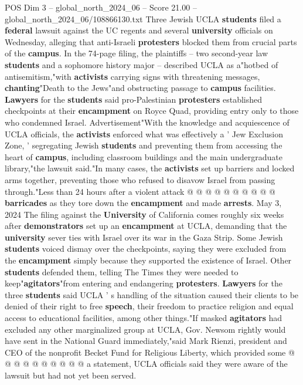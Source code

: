 \begin{textsample}{POS Dim 3 – global\_north\_2024\_06 – Score 21.00 – global\_north\_2024\_06/108866130.txt}  \label{ex:f3_pos_073}
Three Jewish UCLA \textbf{students} filed a \textbf{federal} lawsuit against the UC regents and several \textbf{university} officials on Wednesday, alleging that anti-Israeli \textbf{protesters} blocked them from crucial parts of the \textbf{campus}.
In the 74-page filing, the plaintiffs -- two second-year law \textbf{students} and a sophomore history major -- described UCLA as a"hotbed of antisemitism,"with \textbf{activists} carrying signs with threatening messages, \textbf{chanting}"Death to the Jews"and obstructing passage to \textbf{campus} facilities. \textbf{Lawyers} for the \textbf{students} said pro-Palestinian \textbf{protesters} established checkpoints at their \textbf{encampment} on Royce Quad, providing entry only to those who condemned Israel.
Advertisement"With the knowledge and acquiescence of UCLA officials, the \textbf{activists} enforced what was effectively a ' Jew Exclusion Zone, ' segregating Jewish \textbf{students} and preventing them from accessing the heart of \textbf{campus}, including classroom buildings and the main undergraduate library,"the lawsuit said."In many cases, the \textbf{activists} set up barriers and locked arms together, preventing those who refused to disavow Israel from passing through."Less than 24 hours after a violent attack @ @ @ @ @ @ @ @ @ @ \textbf{barricades} as they tore down the \textbf{encampment} and made \textbf{arrests}.
May 3, 2024 The filing against the \textbf{University} of California comes roughly six weeks after \textbf{demonstrators} set up an \textbf{encampment} at UCLA, demanding that the \textbf{university} sever ties with Israel over its war in the Gaza Strip.
Some Jewish \textbf{students} voiced dismay over the checkpoints, saying they were excluded from the \textbf{encampment} simply because they supported the existence of Israel.
Other \textbf{students} defended them, telling The Times they were needed to keep"\textbf{agitators}"from entering and endangering \textbf{protesters}. \textbf{Lawyers} for the three \textbf{students} said UCLA ' s handling of the situation caused their clients to be denied of their right to free \textbf{speech}, their freedom to practice religion and equal access to educational facilities, among other things."If masked \textbf{agitators} had excluded any other marginalized group at UCLA, Gov.
Newsom rightly would have sent in the National Guard immediately,"said Mark Rienzi, president and CEO of the nonprofit Becket Fund for Religious Liberty, which provided some @ @ @ @ @ @ @ @ @ @ a statement, UCLA officials said they were aware of the lawsuit but had not yet been served.

\end{textsample}
